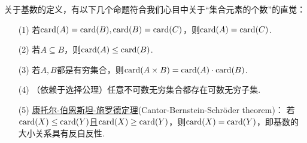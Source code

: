 \documentclass[main.tex]{subfiles}
\begin{document}
关于基数的定义，有以下几个命题符合我们心目中关于“集合元素的个数”的直觉：
\begin{itemize}
    \item [(1)] 若\({\rm card}(A)={\rm card}(B), {\rm card}(B)={\rm card}(C)\)，则\({\rm card}(A)={\rm card}(C)\).
    \item [(2)] 若\(A \subseteq B\)，则\({\rm card}(A) \leq {\rm card}(B)\).
    \item [(3)] 若\(A,B\)都是有穷集合，则\({\rm card}(A \times B) = {\rm card}(A) \cdot {\rm card}(B)\).
    \item [(4)] （依赖于选择公理）任意不可数无穷集合都存在可数无穷子集.
    \item [(5)] \uline{康托尔-伯恩斯坦-施罗德定理}(Cantor-Bernstein-Schröder theorem)：
    \newline
    若\({\rm card}(X) \leq {\rm card}(Y)\)且\({\rm card}(X) \geq {\rm card}(Y)\)，则\({\rm card}(X) = {\rm card}(Y)\)，即基数的大小关系具有反自反性.
\end{itemize}
\end{document}
